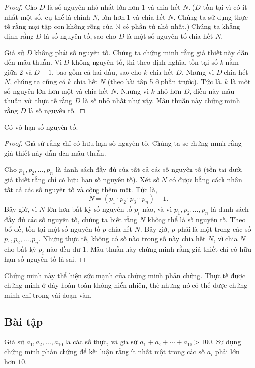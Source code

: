 \begin{proof}
Cho $D$ là số nguyên nhỏ nhất lớn hơn $1$ và chia hết $N$. ($D$ tồn tại vì có ít nhất một số, cụ thể là chính $N$, lớn hơn $1$ và chia hết $N$. Chúng ta sử dụng thực tế rằng mọi tập con không rỗng của $\mathbb{N}$ có phần tử nhỏ nhất.) Chúng ta khẳng định rằng $D$ là số nguyên tố, sao cho $D$ là một số nguyên tố chia hết $N$.

Giả sử $D$ không phải số nguyên tố. Chúng ta chứng minh rằng giả thiết này dẫn đến mâu thuẫn. Vì $D$ không nguyên tố, thì theo định nghĩa, tồn tại số $k$ nằm giữa $2$ và $D - 1$, bao gồm cả hai đầu, sao cho $k$ chia hết $D$. Nhưng vì $D$ chia hết $N$, chúng ta cũng có $k$ chia hết $N$ (theo bài tập 5 ở phần trước). Tức là, $k$ là một số nguyên lớn hơn một và chia hết $N$. Nhưng vì $k$ nhỏ hơn $D$, điều này mâu thuẫn với thực tế rằng $D$ là số nhỏ nhất như vậy. Mâu thuẫn này chứng minh rằng $D$ là số nguyên tố.
\end{proof}

\begin{theorem}
Có vô hạn số nguyên tố.
\end{theorem}

\begin{proof}
Giả sử rằng chỉ có hữu hạn số nguyên tố. Chúng ta sẽ chứng minh rằng giả thiết này dẫn đến mâu thuẫn.

Cho $p_1, p_2, \ldots, p_n$ là danh sách đầy đủ của tất cả các số nguyên tố (tồn tại dưới giả thiết rằng chỉ có hữu hạn số nguyên tố). Xét số $N$ có được bằng cách nhân tất cả các số nguyên tố và cộng thêm một. Tức là,
\[N = (p_1 \cdot p_2 \cdot p_3 \cdots p_n) + 1.\]
Bây giờ, vì $N$ lớn hơn bất kỳ số nguyên tố $p_i$ nào, và vì $p_1, p_2, \ldots, p_n$ là danh sách đầy đủ các số nguyên tố, chúng ta biết rằng $N$ không thể là số nguyên tố. Theo bổ đề, tồn tại một số nguyên tố $p$ chia hết $N$. Bây giờ, $p$ phải là một trong các số $p_1, p_2, \ldots, p_n$. Nhưng thực tế, không có số nào trong số này chia hết $N$, vì chia $N$ cho bất kỳ $p_i$ nào đều dư $1$. Mâu thuẫn này chứng minh rằng giả thiết chỉ có hữu hạn số nguyên tố là sai.
\end{proof}

Chứng minh này thể hiện sức mạnh của chứng minh phản chứng. Thực tế được chứng minh ở đây hoàn toàn không hiển nhiên, thế nhưng nó có thể được chứng minh chỉ trong vài đoạn văn.

\subsection*{Bài tập}
\begin{exercise}
Giả sử $a_1, a_2, \ldots, a_{10}$ là các số thực, và giả sử $a_1 + a_2 + \cdots + a_{10} > 100$. Sử dụng chứng minh phản chứng để kết luận rằng ít nhất một trong các số $a_i$ phải lớn hơn $10$.
\end{exercise}

